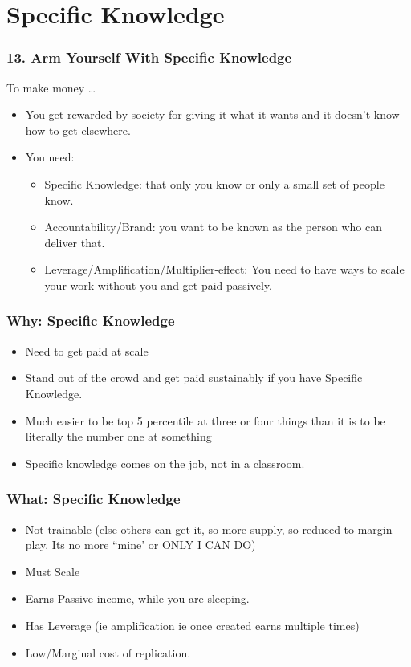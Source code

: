 \section{Specific Knowledge}

\begin{frame}[fragile]
\frametitle{13. Arm Yourself With Specific Knowledge}
To make money \ldots
\begin{itemize}
\item You get rewarded by society for giving it what it wants and it doesn't know how to get elsewhere.
\item You need:
\begin{itemize}
\item Specific Knowledge: that only you know or only a small set of people know.
\item Accountability/Brand: you want to be known as the person who can deliver that.
\item Leverage/Amplification/Multiplier-effect: You need to have ways to scale your work without you and get paid passively.
\end{itemize}
\end{itemize}
\end{frame}

\begin{frame}[fragile]
\frametitle{Why: Specific Knowledge}
\begin{itemize}
\item Need to get paid at scale
\item Stand out of the crowd and get paid sustainably if you have Specific Knowledge.
\item  Much easier to be top 5 percentile at three or four things than it is to be literally the number one at something
\item Specific knowledge comes on the job, not in a classroom.
\end{itemize}
\end{frame}

\begin{frame}[fragile]
\frametitle{What: Specific Knowledge}
\begin{itemize}
\item Not trainable (else others can get it, so more supply, so reduced to margin play. Its no more ``mine' or ONLY I CAN DO)
\item Must Scale
\item Earns Passive income, while you are sleeping.
\item Has Leverage (ie amplification ie once created earns multiple times)
\item Low/Marginal cost of replication.
\end{itemize}
\end{frame}

